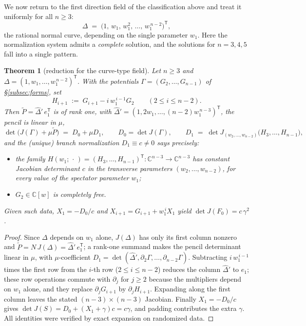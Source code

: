 \documentclass[11pt]{article}
\theoremstyle{plain}
\newtheorem{theorem}{Theorem}[section]
\theoremstyle{definition}
\theoremstyle{remark}
\newcommand{\C}{\mathbb{C}}
\begin{document}
We now return to the first direction field of the classification above and
treat it uniformly for all $n\ge3$:
\[
\Delta\;=\;\bigl(1,\,w_1,\,w_1^2,\,\dots,\,w_1^{\,n-2}\bigr)^{\mathsf T},
\]
the rational normal curve, depending on the single parameter $w_1$. Here the
normalization system admits a \emph{complete} solution, and the solutions for
$n=3,4,5$ fall into a single pattern.

\begin{theorem}[reduction for the curve-type field]\label{thm:curvered}
Let $n\ge3$ and $\Delta=(1,w_1,\dots,w_1^{\,n-2})^{\mathsf T}$. With the
potentials $\Gamma=(G_2,\dots,G_{n-1})$ of \S\ref{subsec:forms}, set
\[
H_{i+1}\;:=\;G_{i+1}-i\,w_1^{\,i-1}G_2\qquad(2\le i\le n-2).
\]
Then $\widetilde P=\widehat\Delta{}'\,e_1^{\mathsf T}$ is of rank one, with
$\widehat\Delta{}'=(1,2w_1,\dots,(n-2)w_1^{\,n-3})^{\mathsf T}$, the pencil
is linear in $\mu$,
\[
\det\bigl(J(\Gamma)+\mu\widetilde P\bigr)\;=\;D_0+\mu D_1,
\qquad
D_0=\det J(\Gamma),
\qquad
D_1\;=\;\det J_{(w_2,\dots,w_{n-2})}\bigl(H_3,\dots,H_{n-1}\bigr),
\]
and the (unique) branch normalization $D_1\equiv c\neq0$ says precisely:
\begin{itemize}
\item[(i)] the family
$H(w_1;\,\cdot\,)=(H_3,\dots,H_{n-1})^{\mathsf T}\colon\C^{n-3}\to\C^{n-3}$ has constant
Jacobian determinant $c$ in the transverse parameters $(w_2,\dots,w_{n-2})$,
for every value of the spectator parameter $w_1$;
\item[(ii)] $G_2\in\C[w]$ is completely free.
\end{itemize}
Given such data, $X_1=-D_0/c$ and $X_{i+1}=G_{i+1}+w_1^{\,i}X_1$ yield
$\det J(F_0)=c\,\gamma^2$.
\end{theorem}

\begin{proof}
Since $\Delta$ depends on $w_1$ alone, $J(\Delta)$ has only its first column
nonzero and $\widetilde P=N\,J(\Delta)=\widehat\Delta{}'\,e_1^{\mathsf T}$;
a rank-one summand makes the pencil determinant linear
in $\mu$, with $\mu$-coefficient $D_1=\det(\widehat\Delta{}',\partial_2\Gamma,\dots,
\partial_{n-2}\Gamma)$. Subtracting $i\,w_1^{\,i-1}$ times the first row from
the $i$-th row ($2\le i\le n-2$) reduces the column $\widehat\Delta{}'$ to $e_1$; these row
operations commute with $\partial_j$ for $j\ge2$ because the multipliers
depend on $w_1$ alone, and they replace $\partial_jG_{i+1}$ by
$\partial_jH_{i+1}$. Expanding along the first column leaves the stated
$(n-3)\times(n-3)$ Jacobian. Finally $X_1=-D_0/c$ gives
$\det J(S)=D_0+(X_1+\gamma)c=c\gamma$, and padding contributes the extra
$\gamma$. All identities were verified by exact expansion on randomized data.
\end{proof}
\end{document}
